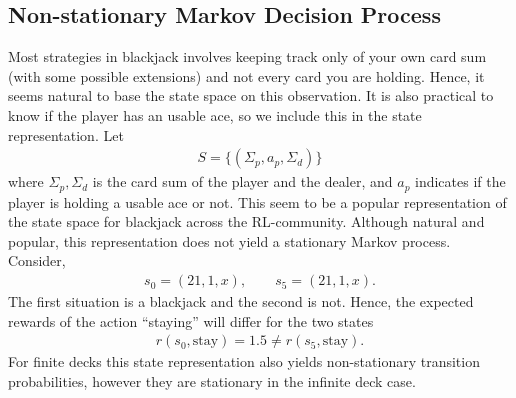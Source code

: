 \subsection*{Non-stationary Markov Decision Process}
Most strategies in blackjack involves keeping track only of your own card sum (with some possible extensions) and not every card you are holding. 
Hence, it seems natural to base the state space on this observation. It is also practical to know if the player has an usable ace, so we include this in the state representation. 
Let
\begin{align*}
	S = \{  (\Sigma_p, a_p, \Sigma_d )  \}
\end{align*}
where $\Sigma_p,\Sigma_d$ is the card sum of the player and the dealer, and $a_p$ indicates if the player is holding a usable ace or not. 
This seem to be a popular representation of the state space for blackjack across the RL-community. 
Although natural and popular, this representation does not yield a stationary Markov process. Consider,
\begin{align*}
	s_0 = (21, 1, x),\qquad s_5 = (21,1,x).
\end{align*}
The first situation is a blackjack and the second is not. Hence, the expected rewards of the action ``staying'' will differ for the two states
\begin{align*}
	r(s_0, \text{stay}) = 1.5 \neq r(s_5, \text{stay}). 
\end{align*}
For finite decks this state representation also yields non-stationary transition probabilities, however they are stationary in the infinite deck case.

